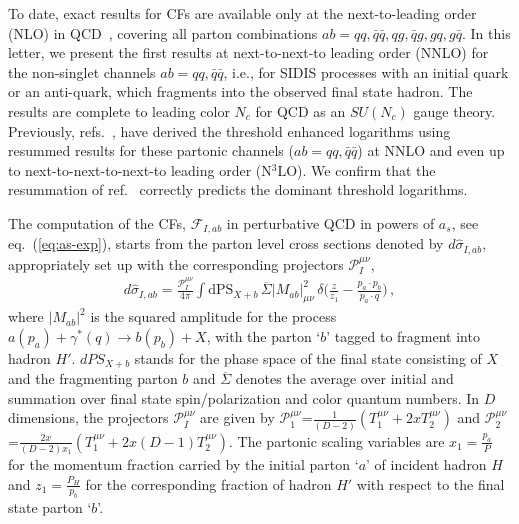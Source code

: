 \documentclass[%
 twocolumn,
 superscriptaddress,
 preprintnumbers,
 nofootinbib,
 amsmath,amssymb,
 aps,
 prl,
]{revtex4}
\begin{document}
To date, exact results for CFs are available only at the next-to-leading order (NLO) in QCD~\cite{Altarelli:1979kv,Furmanski:1981cw}, 
covering all parton combinations $ab = qq, \bar{q} \bar{q}, qg, \bar{q}g, gq, g\bar{q}$. 
In this letter, we present the first results at next-to-next-to leading order (NNLO) for the non-singlet channels $ab=q q, \bar{q} \bar{q}$, 
i.e., for SIDIS processes with an initial quark or an anti-quark, which fragments into the observed final state hadron.
The results are complete to leading color $N_c$ for QCD as an $SU(N_c)$ gauge theory.
Previously, refs.~\cite{Abele:2021nyo}, \cite{Abele:2022wuy} have derived the threshold enhanced logarithms using resummed results for these partonic channels ($ab=q q ,\bar{q} \bar{q}$)
at NNLO and even up to next-to-next-to-next-to leading order (N$^3$LO). 
We confirm that the resummation of ref.~\cite{Abele:2021nyo} correctly predicts the dominant threshold logarithms.
 
The computation of the CFs, $\mathcal{F}_{I,ab}$ in perturbative QCD in powers of $a_s$, see eq.~(\ref{eq:as-exp}), starts from the parton level cross sections denoted by $d\hat{\sigma}_{I,ab}$, appropriately set up with the corresponding projectors $\mathcal{P}^{\mu\nu}_I$,
%
\begin{eqnarray}
\label{eq:parton-crs}
d\hat{\sigma}_{I,ab} = \frac{\mathcal{P}_I^{\mu\nu}}{4\pi}\int \text{dPS}_{X+b}\, \overline{\Sigma}|{M}_{ab}|^{2}_{\mu\nu}\, \delta\Big(\frac{z}{z_1}-\frac{p_a \cdot p_b}{p_a\cdot q}\Big) 
\, ,
\end{eqnarray}
% 
where $|M_{ab}|^2$ is the squared amplitude for the process $a(p_a)+\gamma^{*}(q)\rightarrow b(p_b) + X $, with the parton `$b$' tagged to fragment into hadron $H'$.  $dPS_{X+b}$ stands for the phase space of the final state consisting of $X$ and the fragmenting parton $b$ and $\overline{\Sigma}$ denotes the average over initial and summation over final state spin/polarization and color quantum numbers.
In $D$ dimensions, the projectors $\mathcal{P}^{\mu\nu}_{I}$ are given by 
$\mathcal{P}^{\mu\nu}_1$=$\frac{1}{(D-2)}(T^{\mu\nu}_1+2xT^{\mu\nu}_2)$ and $\mathcal{P}^{\mu\nu}_2$=$\frac{2x}{(D-2)x_1}(T^{\mu\nu}_1+2x(D-1)T^{\mu\nu}_2)$. 
The partonic scaling variables are $x_1=\frac{p_a}{P}$ for the momentum fraction carried by the initial parton `$a$' of incident hadron $H$ and $z_1=\frac{P_H}{p_b}$ for the corresponding fraction of hadron $H'$ with respect to the final state parton `$b$'.
\end{document}
